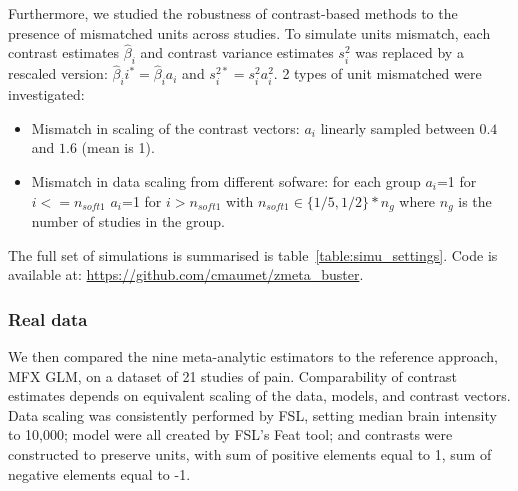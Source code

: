 \documentclass[preprint]{elsarticle}
\newcommand{\effectvector}{\hat\beta}
\newcommand{\effect}[1][i]{\effectvector_{#1}}
\newcommand{\effectunits}[1][i]{\effect{#1}^*}
\newcommand{\vareffect}[1][i]{s^2_{#1}}
\newcommand{\vareffectunits}[1][i]{s^{2*}_{#1}}
\begin{document}
Furthermore, we studied the robustness of contrast-based methods to the presence of mismatched units across studies. To simulate units mismatch, each contrast estimates $\effect$ and contrast variance estimates $\vareffect$ was replaced by a rescaled version: $\effectunits = \effect a_i$ and $\vareffectunits = \vareffect a_i^2$. 2 types of unit mismatched were investigated: 
\begin{itemize}
	\item Mismatch in scaling of the contrast vectors: $a_i$ linearly sampled between $0.4$ and $1.6$ (mean is 1).
	\item Mismatch in data scaling from different sofware: for each group $a_i$=1 for $i <= n_{soft1}$ $a_i$=1 for $i > n_{soft1}$ with $n_{soft1} \in \{1/5, 1/2\}*n_g$ where $n_g$ is the number of studies in the group.
\end{itemize}


The full set of simulations is summarised is table~\ref{table:simu_settings}. Code is available at: \url{https://github.com/cmaumet/zmeta_buster}.


\subsubsection{Real data}
We then compared the nine meta-analytic estimators to the reference approach, MFX GLM, on a dataset of 21 studies of pain. 
Comparability of contrast estimates depends on equivalent scaling of the data, models, and contrast vectors. Data scaling was consistently performed by FSL, setting median brain intensity to 10,000; model were all created by FSL's Feat tool; and contrasts were constructed to preserve units, with sum of positive elements equal to 1, sum of negative elements equal to -1. 




\end{document}

